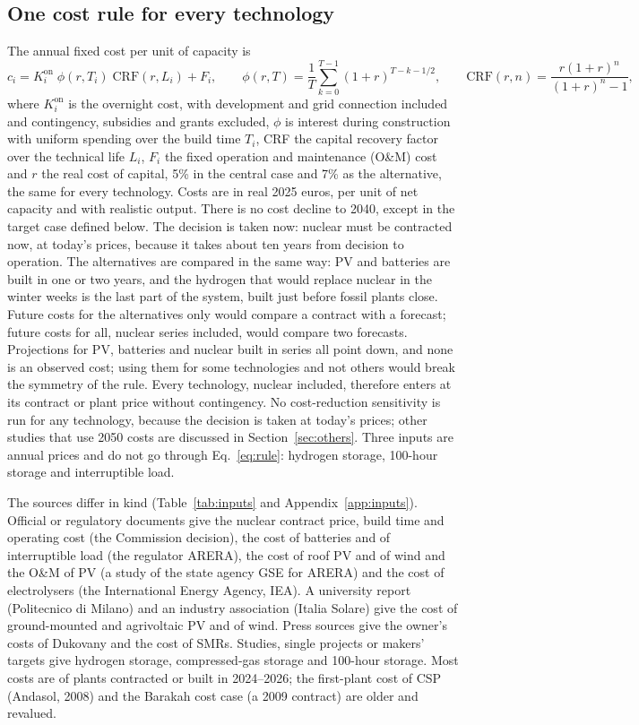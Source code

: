 \subsection{One cost rule for every technology}\label{sec:rule}
The annual fixed cost per unit of capacity is
\begin{equation}
c_i=K^{\mathrm{on}}_i\;\phi(r,T_i)\;\mathrm{CRF}(r,L_i)+F_i ,\qquad
\phi(r,T)=\frac1T\sum_{k=0}^{T-1}(1+r)^{T-k-1/2},\qquad
\mathrm{CRF}(r,n)=\frac{r(1+r)^n}{(1+r)^n-1},\label{eq:rule}
\end{equation}
where $K^{\mathrm{on}}_i$ is the overnight cost, with development and grid connection included and contingency, subsidies and grants excluded, $\phi$ is interest during construction with uniform spending over the build time $T_i$, CRF the capital recovery factor over the technical life $L_i$, $F_i$ the fixed operation and maintenance (O\&M) cost and $r$ the real cost of capital, 5\% in the central case and 7\% as the alternative, the same for every technology. Costs are in real 2025 euros, per unit of net capacity and with realistic output. There is no cost decline to 2040, except in the target case defined below. The decision is taken now: nuclear must be contracted now, at today's prices, because it takes about ten years from decision to operation. The alternatives are compared in the same way: PV and batteries are built in one or two years, and the hydrogen that would replace nuclear in the winter weeks is the last part of the system, built just before fossil plants close. Future costs for the alternatives only would compare a contract with a forecast; future costs for all, nuclear series included, would compare two forecasts. Projections for PV, batteries and nuclear built in series all point down, and none is an observed cost; using them for some technologies and not others would break the symmetry of the rule. Every technology, nuclear included, therefore enters at its contract or plant price without contingency. No cost-reduction sensitivity is run for any technology, because the decision is taken at today's prices; other studies that use 2050 costs are discussed in Section~\ref{sec:others}. Three inputs are annual prices and do not go through Eq.~\eqref{eq:rule}: hydrogen storage, 100-hour storage and interruptible load.

The sources differ in kind (Table~\ref{tab:inputs} and Appendix~\ref{app:inputs}). Official or regulatory documents give the nuclear contract price, build time and operating cost (the Commission decision), the cost of batteries and of interruptible load (the regulator ARERA), the cost of roof PV and of wind and the O\&M of PV (a study of the state agency GSE for ARERA) and the cost of electrolysers (the International Energy Agency, IEA). A university report (Politecnico di Milano) and an industry association (Italia Solare) give the cost of ground-mounted and agrivoltaic PV and of wind. Press sources give the owner's costs of Dukovany and the cost of SMRs. Studies, single projects or makers' targets give hydrogen storage, compressed-gas storage and 100-hour storage. Most costs are of plants contracted or built in 2024--2026; the first-plant cost of CSP (Andasol, 2008) and the Barakah cost case (a 2009 contract) are older and revalued.

